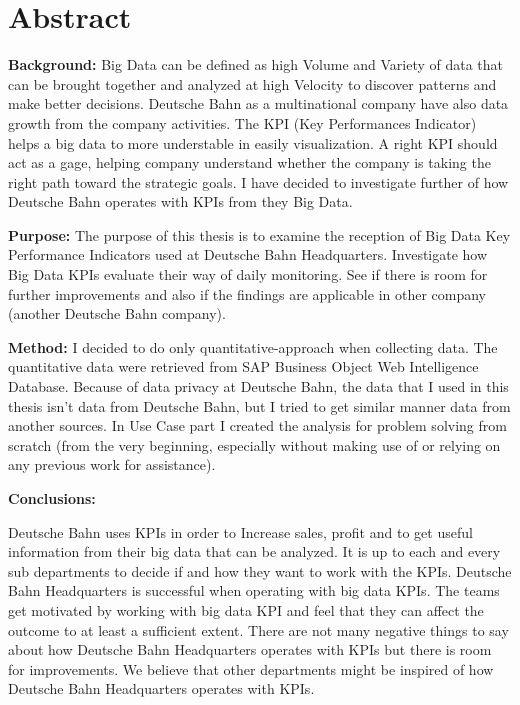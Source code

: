 \documentclass[]{book}
\begin{document}
\section{Abstract}\label{abstract}

\textbf{Background: }Big Data can be defined as high Volume and Variety
of data that can be brought together and analyzed at high Velocity to
discover patterns and make better decisions. Deutsche Bahn as a
multinational company have also data growth from the company activities.
The KPI (Key Performances Indicator) helps a big data to more
understable in easily visualization. A right KPI should act as a gage,
helping company understand whether the company is taking the right path
toward the strategic goals. I have decided to investigate further of how
Deutsche Bahn operates with KPIs from they Big Data.

\textbf{Purpose: } The purpose of this thesis is to examine the
reception of Big Data Key Performance Indicators used at Deutsche Bahn
Headquarters. Investigate how Big Data KPIs evaluate their way of daily
monitoring. See if there is room for further improvements and also if
the findings are applicable in other company (another Deutsche Bahn
company).

\textbf{Method: } I decided to do only quantitative-approach when
collecting data. The quantitative data were retrieved from SAP Business
Object Web Intelligence Database. Because of data privacy at Deutsche
Bahn, the data that I used in this thesis isn't data from Deutsche Bahn,
but I tried to get similar manner data from another sources. In Use Case
part I created the analysis for problem solving from scratch (from the
very beginning, especially without making use of or relying on any
previous work for assistance).

\textbf{Conclusions: }

Deutsche Bahn uses KPIs in order to Increase sales, profit and to get
useful information from their big data that can be analyzed. It is up to
each and every sub departments to decide if and how they want to work
with the KPIs. Deutsche Bahn Headquarters is successful when operating
with big data KPIs. The teams get motivated by working with big data KPI
and feel that they can affect the outcome to at least a sufficient
extent. There are not many negative things to say about how Deutsche
Bahn Headquarters operates with KPIs but there is room for improvements.
We believe that other departments might be inspired of how Deutsche Bahn
Headquarters operates with KPIs.
\end{document}
